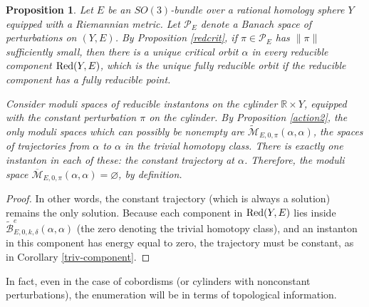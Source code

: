 \documentclass[10pt,a4paper]{amsart}
\newtheorem{proposition}[theorem]{Proposition}
\theoremstyle{definition}
\theoremstyle{remark}
\numberwithin{figure}{qchap}
\begin{document}
\begin{proposition}\label{red-flowlines}Let $E$ be an $SO(3)$-bundle over a rational homology sphere $Y$ equipped with a Riemannian metric. Let $\mathcal P_E$ denote a Banach space of perturbations on $(Y,E)$. By Proposition \ref{redcrit}, if $\pi \in \mathcal P_E$ has $\|\pi\|$ sufficiently small, then there is a unique critical orbit $\alpha$ in every reducible component $\textup{Red}(Y,E)$, which is the unique fully reducible orbit if the reducible component has a fully reducible point.

Consider moduli spaces of reducible instantons on the cylinder $\mathbb R \times Y$, equipped with the constant perturbation $\pi$ on the cylinder. By Proposition \ref{action2}, the only moduli spaces which can possibly be nonempty are $\widetilde{\mathcal M}_{E,0,\pi}(\alpha, \alpha)$, the spaces of trajectories from $\alpha$ to $\alpha$ in the trivial homotopy class. There is exactly one instanton in each of these: the constant trajectory at $\alpha$. Therefore, the moduli space $\overline{\mathcal M}_{E,0,\pi}(\alpha, \alpha) = \varnothing$, by definition.
\end{proposition}

\begin{proof}In other words, the constant trajectory (which is always a solution) remains the only solution. Because each component in $\textup{Red}(Y,E)$ lies inside $\widetilde{\mathcal B}^e_{E,0,k,\delta}(\alpha, \alpha)$ (the zero denoting the trivial homotopy class), and an instanton in this component has energy equal to zero, the trajectory must be constant, as in Corollary \ref{triv-component}.
\end{proof}

In fact, even in the case of cobordisms (or cylinders with nonconstant perturbations), the enumeration will be in terms of topological information.
\end{document}
